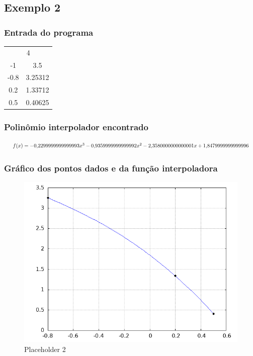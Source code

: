 \documentclass{article}
\begin{document}
    \subsection{Exemplo 2}

            \subsubsection{Entrada do programa}
            \begin{table}[ht!]
                \centering
                \begin{tabular}{cc}
                    \multicolumn{2}{c}{4} \\
                    -1   & 3.5 \\
                    -0.8 & 3.25312 \\
                    0.2  & 1.33712 \\
                    0.5  & 0.40625 \\
                \end{tabular}
            \end{table}


            \subsubsection{Polinômio interpolador encontrado}
            \begin{equation*}
                \resizebox{\textwidth}{!}{$
                f(x) = -0{,}2299999999999993x^3 - 0{,}9359999999999992x^2 - 2{,}3580000000000001x + 1{,}8479999999999996
                $}
            \end{equation*}


            \subsubsection{Gráfico dos pontos dados e da função interpoladora}
                \begin{figure}[H]
                    \centering
                    \includegraphics[width=0.5\linewidth]{exemplo2.png}
                    \caption{Placeholder 2}
                    \label{fig:placeholder2}
                \end{figure}
\end{document}
